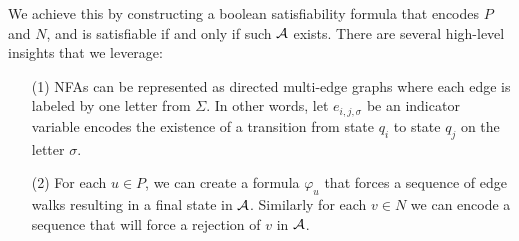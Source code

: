\documentclass[12pt]{article}
\begin{document}
We achieve this by constructing a boolean satisfiability formula
that encodes \(P\) and \(N\),
and is satisfiable if and only if such \(\mathcal{A}\) exists.
There are several high-level insights that we leverage:
\begin{enumerate}
  \item[(1)]
    NFAs can be represented as directed multi-edge graphs
    where each edge is labeled by one letter from \(\Sigma\).
    In other words, let \(e_{i, j, \sigma}\) be an indicator
    variable encodes the existence of a transition from state \(q_i\)
    to state \(q_j\) on the letter \(\sigma\).

  \item[(2)]
    For each \(u \in P\),
    we can create a formula \(\varphi_u\) that forces a sequence of edge walks
    resulting in a final state in \(\mathcal{A}\).
    Similarly for each \(v \in N\) we can encode a sequence that will force
    a rejection of \(v\) in \(\mathcal{A}\).


\end{enumerate}
\end{document}
